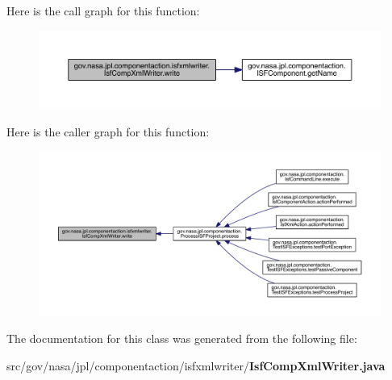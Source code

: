 Here is the call graph for this function\+:
\nopagebreak
\begin{figure}[H]
\begin{center}
\leavevmode
\includegraphics[width=350pt]{classgov_1_1nasa_1_1jpl_1_1componentaction_1_1isfxmlwriter_1_1_isf_comp_xml_writer_ac7914cd4b99539834e2f6e209612d5ec_cgraph}
\end{center}
\end{figure}




Here is the caller graph for this function\+:
\nopagebreak
\begin{figure}[H]
\begin{center}
\leavevmode
\includegraphics[width=350pt]{classgov_1_1nasa_1_1jpl_1_1componentaction_1_1isfxmlwriter_1_1_isf_comp_xml_writer_ac7914cd4b99539834e2f6e209612d5ec_icgraph}
\end{center}
\end{figure}




The documentation for this class was generated from the following file\+:\begin{DoxyCompactItemize}
\item 
src/gov/nasa/jpl/componentaction/isfxmlwriter/{\bf Isf\+Comp\+Xml\+Writer.\+java}\end{DoxyCompactItemize}
